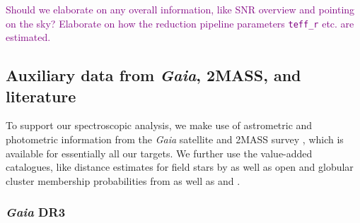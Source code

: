 \documentclass[
  journal=pasa,
  manuscript=research-paper, %
  year=2023,
  volume=37
]{cup-journal}
\newcommand{\SB}[1]{{\textcolor{purple}{#1}}}
\newcommand{\Gaia}{\textit{Gaia}\xspace}
\begin{document}
\SB{Should we elaborate on any overall information, like SNR overview and pointing on the sky?}
\SB{Elaborate on how the reduction pipeline parameters \texttt{teff\_r} etc. are estimated.}

\subsection{Auxiliary data from \Gaia, 2MASS, and literature} \label{sec:non-spec_data}


To support our spectroscopic analysis, we make use of astrometric and photometric information from the \Gaia satellite \citep{Gaia-Collaboration2016} and 2MASS survey \citep{Skrutskie2006}, which is available for essentially all our targets. We further use the value-added catalogues, like distance estimates for field stars by \citep{BailerJones2021} as well as open and globular cluster membership probabilities from \citet{CantatGaudin2020} as well as \citet{Vasiliev2021} and \citet{Baumgardt2021}.

\subsubsection{\Gaia DR3}
\end{document}
